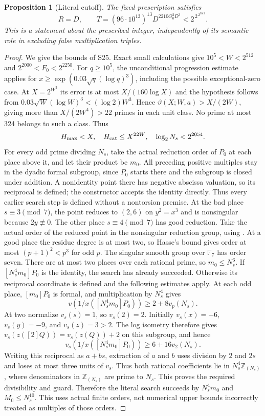 \documentclass[11pt]{article}
\newtheorem{proposition}[theorem]{Proposition}
\theoremstyle{definition}
\theoremstyle{remark}
\newcommand{\Z}{\mathbb Z}
\newcommand{\F}{\mathbb F}
\begin{document}
\begin{proposition}[Literal cutoff]\label{prop:cutoff}
The fixed prescription satisfies
\[
 R=D,\qquad T=(96\cdot10^{13})^{13}D^{2210G_0^2D^3}
            <2^{\,2^{\,2^{9013}}}.
\]
This is a statement about the prescribed integer, independently of its
semantic role in excluding false multiplication triples.
\end{proposition}
\begin{proof}
We give the bounds of S25. Exact small calculations give
$10^5<W<2^{512}$ and $2^{2000}<F_0<2^{2250}$.
For $q\ge10^5$, the unconditional progression estimate
\cite[Theorem 1.2, (1.10)--(1.11), Corollary 6.17 with $A=1$]{bmor}
applies for $x\ge\exp(0.03\sqrt q(\log q)^3)$, including the possible
exceptional-zero case. At $X=2^{W^3}$ its error is at most
$X/(160\log X)$ and the hypothesis follows from
$0.03\sqrt W(\log W)^3<(\log2)W^3$.
Hence $\vartheta(X;W,a)>X/(2W)$, giving more than
$X/(2W^4)>22$ primes in each unit class. No prime at most 324
belongs to such a class. Thus
\[
 H_{\max}<X,\quad H_{\rm cat}\le X^{22W},\quad
 \log_2N_s<2^{2054}.
\]
For every odd prime dividing $N_s$, take the actual reduction order of
$P_0$ at each place above it, and let their product be $m_0$.
All preceding positive multiples stay in the dyadic formal subgroup,
since $P_0$ starts there and the subgroup is closed under addition.
A nonidentity point there has negative abscissa valuation, so its
reciprocal is defined; the constructor accepts the identity directly.
Thus every earlier search step is defined without a nontorsion premise.
At the bad place $s\equiv3\pmod7$, the point reduces to $(2,6)$
on $y^2=x^3$ and is nonsingular because $2y\not\equiv0$.
The other place $s\equiv4\pmod7$ has good reduction.
Take the actual order of the reduced point in the nonsingular
reduction group, using
\cite[VII.2.1, p.~188]{silverman}.
At a good place the residue degree is at most two, so Hasse's
bound \cite[V.1.1, p.~138]{silverman} gives order at most
$(p+1)^2<p^3$ for odd $p$. The singular smooth group over
$\F_7$ has order seven. There are at most two places over each
rational prime, so $m_0\le N_s^6$.
If $[N_s^4m_0]P_0$ is the identity, the search has already succeeded.
Otherwise its reciprocal coordinate is defined and the following
estimates apply. At each odd place, $[m_0]P_0$ is formal, and multiplication by
$N_s^4$ gives
\[
 v(1/x([N_s^4m_0]P_0))\ge2+8v_p(N_s).
\]
At two normalize $v_s(s)=1$, so $v_s(2)=2$. Initially
$v_s(x)=-6$, $v_s(y)=-9$, and $v_s(z)=3>2$.
The log isometry therefore gives
$v_s(z([2]Q))=v_s(z(Q))+2$ on this subgroup, and hence
\[
 v_s(1/x([N_s^4m_0]P_0))\ge6+16v_2(N_s).
\]
Writing this reciprocal as $a+bs$, extraction of $a$ and $b$
uses division by $2$ and $2s$ and loses at most three units of
$v_s$. Thus both rational coefficients lie in
$N_s^4\Z_{(N_s)}$, where denominators in $\Z_{(N_s)}$ are
prime to $N_s$. This proves the required divisibility and guard. Therefore the literal search
succeeds by $N_s^4m_0$ and $M_0\le N_s^{10}$.
This uses actual finite orders, not numerical upper bounds incorrectly
treated as multiples of those orders.


\end{proof}
\end{document}
